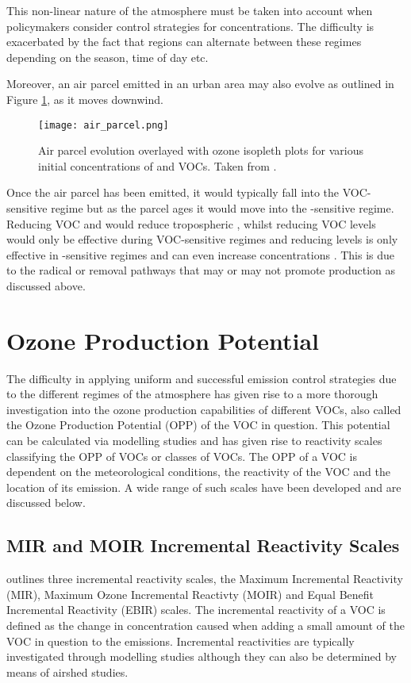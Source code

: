 This non-linear nature of the atmosphere must be taken into account when policymakers consider control strategies for  concentrations. 
The difficulty is exacerbated by the fact that regions can alternate between these regimes depending on the season, time of day etc. 

Moreover, an air parcel emitted in an urban area may also evolve as outlined in Figure \ref{f:air_parcel}, as it moves downwind. 
\begin{figure}
	\begin{center}
		\texttt{[image: air\_parcel.png]}
		\caption{Air parcel evolution overlayed with ozone isopleth plots for various initial concentrations of  and VOCs. Taken from \citep{Sillman:1999}.}
		\label{f:air_parcel}
	\end{center}
\end{figure}
Once the air parcel has been emitted, it would typically fall into the VOC-sensitive regime but as the parcel ages it would move into the -sensitive regime. 
Reducing VOC and  would reduce tropospheric , whilst reducing VOC levels would only be effective during VOC-sensitive regimes and reducing  levels is only effective in -sensitive regimes and can even increase  concentrations \citep{Sillman:1999}. 
This is due to the radical or  removal pathways that may or may not promote  production as discussed above.

\section{Ozone Production Potential}
The difficulty in applying uniform and successful emission control strategies due to the different regimes of the atmosphere has given rise to a more thorough investigation into the ozone production capabilities of different VOCs, also called the Ozone Production Potential (OPP) of the VOC in question. 
This potential can be calculated via modelling studies and has given rise to reactivity scales classifying the OPP of VOCs or classes of VOCs. 
The OPP of a VOC is dependent on the meteorological conditions, the reactivity of the VOC and the location of its emission. 
A wide range of such scales have been developed and are discussed below.

\subsection{MIR and MOIR Incremental Reactivity Scales} \label{s:MIR&MOIR}
\citep{Carter:1994} outlines three incremental reactivity scales, the Maximum Incremental Reactivity (MIR), Maximum Ozone Incremental Reactivty (MOIR) and Equal Benefit Incremental Reactivity (EBIR) scales. 
The incremental reactivity of a VOC is defined as the change in  concentration caused when adding a small amount of the VOC in question to the emissions. 
Incremental reactivities are typically investigated through modelling studies although they can also be determined by means of airshed studies. 

